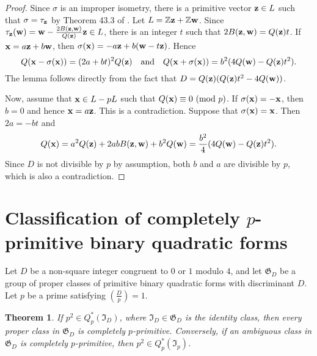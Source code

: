 \documentclass{amsart}
\newtheorem{thm}{Theorem}[section]
\theoremstyle{definition}
\theoremstyle{remark}
\numberwithin{equation}{section}
\begin{document}
\begin{proof}  Since $\sigma$ is an improper isometry, there is a primitive vector $\bold z \in L$ such that $\sigma=\tau_{\bold z}$ by Theorem 43.3 of \cite{OM}. Let $L={{\mathbb Z}} \bold z+{{\mathbb Z}} \bold w$. Since $\tau_{\bold z}(\bold w)=\bold w-\frac{2B(\bold z,\bold w)}{Q(\bold z)} \bold z \in L$, there is an integer $t$ such that $2B(\bold z,\bold w)=Q(\bold z)t$. If $\bold x=a\bold z+b\bold w$, then $\sigma(\bold x)=-a\bold z+b(\bold w-t\bold z)$. Hence 
$$
Q(\bold x-\sigma(\bold x))=(2a+bt)^2Q(\bold z) \quad \text{and} \quad  Q(\bold x+\sigma(\bold x))=b^2(4Q(\bold w)-Q(\bold z)t^2).
$$ 
The lemma follows directly from the fact that $D=Q(\bold z)(Q(\bold z)t^2-4Q(\bold w))$. 

Now, assume that $\bold x \in L-pL$ such that $Q(\bold x) \equiv 0 \ (\text{mod } p)$. If $\sigma(\bold x)=-\bold x$, then $b=0$ and hence $\bold x=a\bold z$.  This is a contradiction. Suppose that $\sigma(\bold x)=\bold x$. Then $2a=-bt$ and 
$$
Q(\bold x)=a^2Q(\bold z)+2abB(\bold z,\bold w)+b^2Q(\bold w)=\frac{b^2}4(4Q(\bold w)-Q(\bold z)t^2).
$$ 
Since $D$ is not divisible by $p$ by assumption, both $b$ and $a$ are divisible by $p$, which is also a contradiction. 
\end{proof} 
 
 
 
\section{Classification of completely $p$-primitive binary quadratic forms}

Let $D$ be a non-square integer congruent to $0$ or $1$ modulo $4$, and let $\mathfrak G_D$ be a group of proper classes of primitive binary quadratic forms with discriminant $D$. Let $p$ be a prime satisfying $\left( \frac Dp\right)=1$. 

\begin{thm} \label{ambithm} If $p^2 \in Q_p^*(\mathfrak I_D)$, where $\mathfrak I_D \in \mathfrak G_D$ is the identity class, then every proper class in $\mathfrak G_D$ is completely $p$-primitive. Conversely,  if  an ambiguous class in $\mathfrak G_D$  is completely $p$-primitive, then $p^2 \in Q_p^*(\mathfrak I_p)$. 
 \end{thm}
\end{document}
